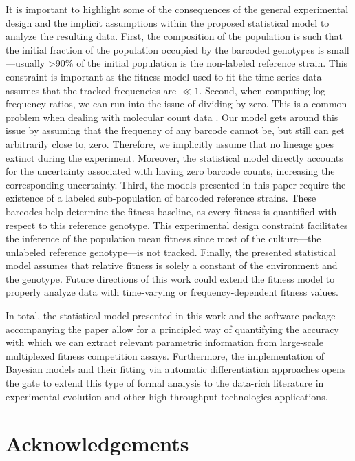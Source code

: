 \documentclass[
  letterpaper,
  DIV=11,
  numbers=noendperiod]{scrartcl}
\begin{document}
\begin{refsegment}
It is important to highlight some of the consequences of the general
experimental design and the implicit assumptions within the proposed
statistical model to analyze the resulting data. First, the composition
of the population is such that the initial fraction of the population
occupied by the barcoded genotypes is small---usually \textgreater90\%
of the initial population is the non-labeled reference strain. This
constraint is important as the fitness model used to fit the time series
data assumes that the tracked frequencies are \(\ll 1\). Second, when
computing log frequency ratios, we can run into the issue of dividing by
zero. This is a common problem when dealing with molecular count data
\autocite{lovell2020}. Our model gets around this issue by assuming that
the frequency of any barcode cannot be, but still can get arbitrarily
close to, zero. Therefore, we implicitly assume that no lineage goes
extinct during the experiment. Moreover, the statistical model directly
accounts for the uncertainty associated with having zero barcode counts,
increasing the corresponding uncertainty. Third, the models presented in
this paper require the existence of a labeled sub-population of barcoded
reference strains. These barcodes help determine the fitness baseline,
as every fitness is quantified with respect to this reference genotype.
This experimental design constraint facilitates the inference of the
population mean fitness since most of the culture---the unlabeled
reference genotype---is not tracked. Finally, the presented statistical
model assumes that relative fitness is solely a constant of the
environment and the genotype. Future directions of this work could
extend the fitness model to properly analyze data with time-varying or
frequency-dependent fitness values.

In total, the statistical model presented in this work and the software
package accompanying the paper allow for a principled way of quantifying
the accuracy with which we can extract relevant parametric information
from large-scale multiplexed fitness competition assays. Furthermore,
the implementation of Bayesian models and their fitting via automatic
differentiation approaches opens the gate to extend this type of formal
analysis to the data-rich literature in experimental evolution and other
high-throughput technologies applications.

\hypertarget{acknowledgements}{%
\section{Acknowledgements}\label{acknowledgements}}


\end{refsegment}
\end{document}
